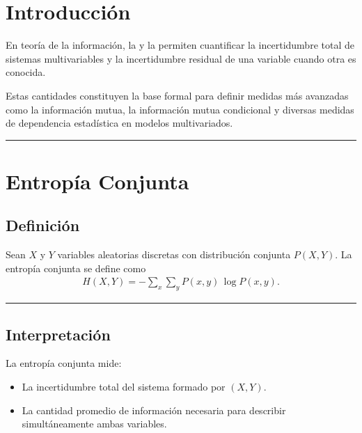 \documentclass[letterpaper,10pt,english]{jupyterBook}
\begin{document}
\section{Introducción}
\label{\detokenize{01_theory/conditional_entropy:introduccion}}
\sphinxAtStartPar
En teoría de la información, la  y la 
permiten cuantificar la incertidumbre total de sistemas multivariables y la
incertidumbre residual de una variable cuando otra es conocida.

\sphinxAtStartPar
Estas cantidades constituyen la base formal para definir medidas más avanzadas
como la información mutua, la información mutua condicional y diversas medidas
de dependencia estadística en modelos multivariados.


\bigskip\hrule\bigskip



\section{Entropía Conjunta}
\label{\detokenize{01_theory/conditional_entropy:entropia-conjunta}}

\subsection{Definición}
\label{\detokenize{01_theory/conditional_entropy:definicion}}
\sphinxAtStartPar
Sean \(X\) y \(Y\) variables aleatorias discretas con distribución conjunta
\(P(X,Y)\). La entropía conjunta se define como
\begin{equation*}
\begin{split}
H(X,Y) = - \sum_{x} \sum_{y} P(x,y)\,\log P(x,y).
\end{split}
\end{equation*}

\bigskip\hrule\bigskip



\subsection{Interpretación}
\label{\detokenize{01_theory/conditional_entropy:interpretacion}}
\sphinxAtStartPar
La entropía conjunta mide:
\begin{itemize}
\item {} 
\sphinxAtStartPar
La incertidumbre total del sistema formado por \((X,Y)\).

\item {} 
\sphinxAtStartPar
La cantidad promedio de información necesaria para describir simultáneamente
ambas variables.

\end{itemize}
\end{document}
